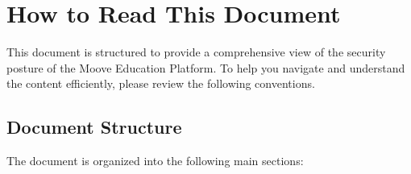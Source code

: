 \def\docTitle{Security Architecture \& Threat Model – Moove Education Platform}
\def\docVersion{3.1}
\def\docDate{July 19, 2026}



\usepackage{caption}
\usepackage{colortbl}






\tableofcontents

\newpage
\listoftables
{}

\newpage
\listoffigures
{}

\newpage
\section*{How to Read This Document}

This document is structured to provide a comprehensive view of the security posture of the Moove Education Platform. To help you navigate and understand the content efficiently, please review the following conventions.

\subsection*{Document Structure}

The document is organized into the following main sections:

